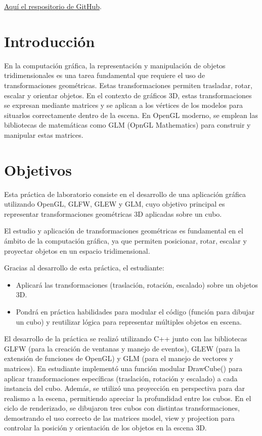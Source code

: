 \documentclass[a4paper,11pt]{article}                 %
\begin{document}
\newpage  
\tableofcontents                                    %


\href{https://github.com/ramen-root/CGIHC}{Aquí el respositorio de GitHub}.

\section{Introducción}
En la computación gráfica, la representación y manipulación de objetos tridimensionales es una tarea fundamental que requiere el uso de transformaciones geométricas. Estas transformaciones permiten trasladar, rotar, escalar y orientar objetos. En el contexto de gráficos 3D, estas transformaciones se expresan mediante matrices y se aplican a los vértices de los modelos para situarlos correctamente dentro de la escena. En OpenGL moderno, se emplean las bibliotecas de matemáticas como GLM (OpnGL Mathematics) para construir y manipular estas matrices.

\section{Objetivos}
Esta práctica de laboratorio consiste en el desarrollo de una aplicación gráfica utilizando OpenGL, GLFW, GLEW y GLM, cuyo objetivo principal es representar transformaciones geométricas 3D aplicadas sobre un cubo.

El estudio y aplicación de transformaciones geométricas es fundamental en el ámbito de la computación gráfica, ya que permiten posicionar, rotar, escalar y proyectar objetos en un espacio tridimensional.

Gracias al desarrollo de esta práctica, el estudiante:
\begin{itemize}
    \item Aplicará las transformaciones (traslación, rotación, escalado) sobre un objetos 3D.
    \item Pondrá en práctica habilidades para modular el código (función para dibujar un cubo) y reutilizar lógica para representar múltiples objetos en escena.
\end{itemize}

El desarrollo de la práctica se realizó utilizando C++ junto con las bibliotecas GLFW (para la creación de ventanas y manejo de eventos), GLEW (para la extensión de funciones de OpenGL) y GLM (para el manejo de vectores y matrices). En estudiante implementó una función modular DrawCube() para aplicar transformaciones específicas (traslación, rotación y escalado) a cada instancia del cubo. Además, se utilizó una proyección en perspectiva para dar realismo a la escena, permitiendo apreciar la profundidad entre los cubos. En el ciclo de renderizado, se dibujaron tres cubos con distintas transformaciones, demostrando el uso correcto de las matrices model, view y projection para controlar la posición y orientación de los objetos en la escena 3D.
\end{document}
